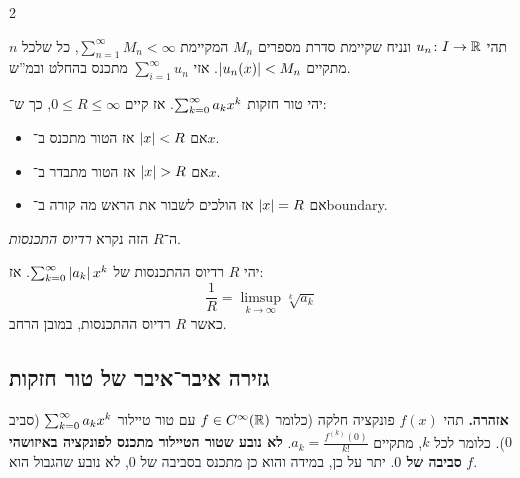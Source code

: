 \documentclass[]{../../../tex/classes/styledArticle}
\begin{document}
\begin{multicols}{2}
			\begin{Theorem}
				תהי $u_n \colon I \to \mathbb{R}$ ונניח שקיימת סדרת מספרים $M_n$ המקיימת $\sum_{n = 1}^{\infty}M_n < \infty$, כל שלכל $n$ מתקיים $\left \lvert u_n(x) \right \rvert < M_n$. אזי $\sum_{i = 1}^{\infty}u_n$ מתכנס בהחלט ובמ''ש. 
			\end{Theorem}
			
			\begin{Theorem}[אבל]
				יהי טור חזקות $\sum_{k = 0}^{\infty} a_kx^{k}$. אז קיים $0 \le R \le \infty$, כך ש־:
				\begin{itemize}
					\item אם $\left \lvert x \right \rvert < R$ אז הטור מתכנס ב־$x$.
					\item אם $\left \lvert x \right \rvert > R$ אז הטור מתבדר ב־$x$.
					\item אם $\left \lvert x \right \rvert = R$ אז הולכים לשבור את הראש מה קורה ב־boundary.
				\end{itemize}
				ה־$R$ הזה נקרא \textit{רדיוס התכנסות}.
			\end{Theorem}
			\begin{Theorem}
				יהי $R$ רדיוס ההתכנסות של $\sum_{k = 0}^{\infty} \left \lvert a_k \right \rvert x^{k}$. אז:
				\[ \frac{1}{R} = \limsup_{k \to \infty}\sqrt[k]{a_k} \]
				כאשר $R$ רדיוס ההתכנסות, במובן הרחב. 
			\end{Theorem}
			
		\subsection{גזירה איבר־איבר של טור חזקות}
			\color{red}\textbf{אזהרה. }\color{black}תהי $f(x)$ פונקציה חלקה (כלומר $f \in C^{\infty}(\mathbb{R})$ עם טור טיילור $\sum_{k = 0}^{\infty} a_kx^{k}$ (סביב $0$). כלומר לכל $k$, מתקיים $a_k = \frac{f^{(k)}(0)}{k!}$. \textbf{לא נובע שטור הטיילור מתכנס לפונקציה באיזושהי סביבה של $0$}. יתר על כן, במידה והוא כן מתכנס בסביבה של $0$, לא נובע שהגבול הוא $f$.

\end{multicols}
\end{document}
